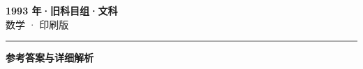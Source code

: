 \documentclass[zihao=5, a4paper]{ctexart}
\begin{document}
\begin{center}
  {\Large\bfseries 1993 年·旧科目组·文科}\\[4pt]
  {\large 数学 · 印刷版}
\end{center}
\medskip
{}

\par\bigskip\hrule\bigskip
{}
\begin{center}{\large\bfseries 参考答案与详细解析}\end{center}
\smallskip

\end{document}
